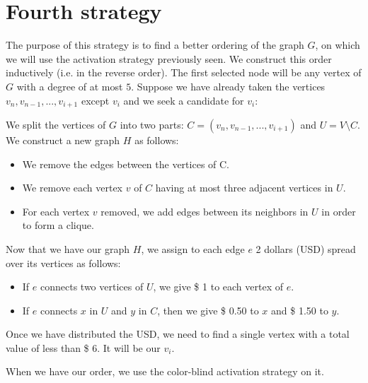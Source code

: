 \section{Fourth strategy}

The purpose of this strategy is to find a better ordering of the graph $G$, on which we will use the activation strategy previously seen. We construct this order inductively (i.e. in the reverse order). The first selected node will be any vertex of $G$ with a degree of at most $5$.
Suppose we have already taken the vertices $v_{n}, v_{n-1}, ..., v_{i+1}$ except $v_{i}$ and we seek a candidate for $v_{i}$:

We split the vertices of $G$ into two parts: $C = (v_{n}, v_{n-1}, ..., v_{i+1})$ and $U = V \setminus C$.
We construct a new graph $H$ as follows:
\begin{itemize}
\item We remove the edges between the vertices of C.
\item We remove each vertex $v$ of $C$ having at most three adjacent vertices in $U$.
\item For each vertex $v$ removed, we add edges between its neighbors in $U$ in order to form a clique.
\end{itemize}

Now that we have our graph $H$, we assign to each edge $e$ 2 dollars (USD) spread over its vertices as follows:
\begin{itemize}
\item If $e$ connects two vertices of $U$, we give \$ 1 to each vertex of $e$.
\item If $e$ connects $x$ in $U$ and $y$ in $C$, then we give \$ 0.50 to $x$ and \$ 1.50 to $y$.
\end{itemize}

Once we have distributed the USD, we need to find a single vertex with a total value of less than \$ 6.
It will be our $v_{i}$.

When we have our order, we use the color-blind activation strategy on it.
